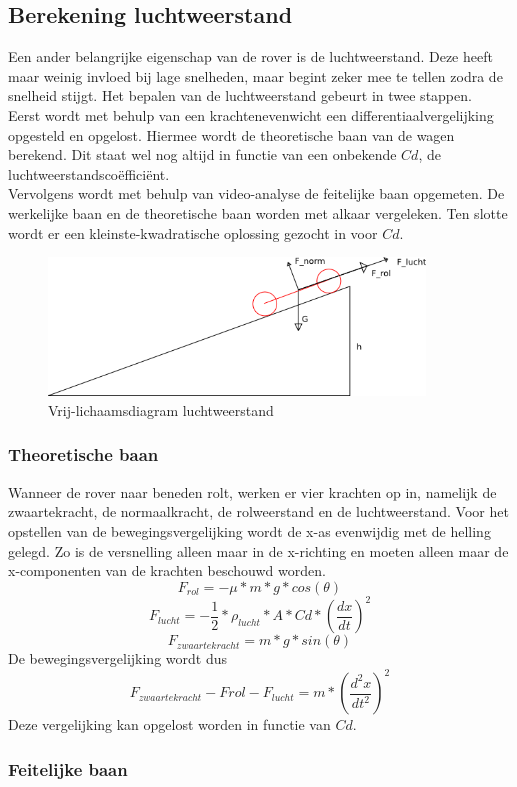 \subsection{Berekening luchtweerstand}
\label{bijlage:luchtweerstand}
Een ander belangrijke eigenschap van de rover is de luchtweerstand. Deze heeft maar weinig invloed bij lage snelheden, maar begint zeker mee te tellen zodra de snelheid stijgt. Het bepalen van de luchtweerstand gebeurt in twee stappen.\\
Eerst wordt met behulp van een krachtenevenwicht een differentiaalvergelijking opgesteld en opgelost. Hiermee wordt de theoretische baan van de wagen berekend. Dit staat wel nog altijd in functie van een onbekende $Cd$, de luchtweerstandsco\"effici\"ent.\\
Vervolgens wordt met behulp van video-analyse de feitelijke baan opgemeten. De werkelijke baan en de theoretische baan worden met alkaar vergeleken. Ten slotte wordt er een kleinste-kwadratische oplossing gezocht in voor $Cd$.\\
\begin{figure}[here]
\includegraphics[width=10cm]{bijlagen/luchtweerstand/luchtweerstand.png}
\caption{Vrij-lichaamsdiagram luchtweerstand}
\label{image:luchtweerstand}
\end{figure}
\subsubsection{Theoretische baan}
Wanneer de rover naar beneden rolt, werken er vier krachten op in, namelijk de zwaartekracht, de normaalkracht, de rolweerstand en de luchtweerstand. Voor het opstellen van de bewegingsvergelijking wordt de x-as evenwijdig met de helling gelegd. Zo is de versnelling alleen maar in de x-richting en moeten alleen maar de x-componenten van de krachten beschouwd worden.
\begin{equation} \label{eq:rolweerstand}
F_{rol}=-\mu*m*g*cos(\theta)
\end{equation}
\begin{equation} \label{eq:luchtweerstand}
F_{lucht}=-\frac{1}{2}*\rho_{lucht}*A*Cd*\left(\frac{dx}{dt}\right)^2
\end{equation}
\begin{equation} \label{eq:zwaartekracht}
F_{zwaartekracht}=m*g*sin(\theta)
\end{equation}
De bewegingsvergelijking wordt dus
\begin{equation}
F_{zwaartekracht} - F{rol}-F_{lucht}=m*\left(\frac{d^2x}{dt^2}\right)^2
\end{equation}
Deze vergelijking kan opgelost worden in functie van $Cd$.
\subsubsection{Feitelijke baan}

